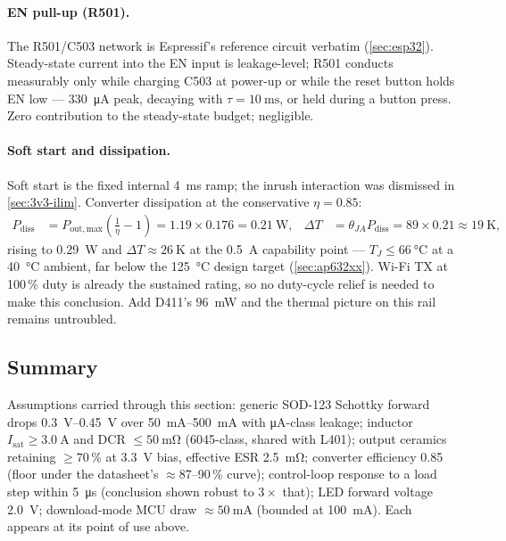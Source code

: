 \paragraph{EN pull-up (R501).} The R501/C503 network is Espressif's reference circuit
verbatim (\cref{sec:esp32}). Steady-state current into the EN input is leakage-level;
R501 conducts measurably only while charging C503 at power-up or while the reset
button holds EN low --- \SI{330}{\micro\ampere} peak, decaying with
$\tau = \SI{10}{\milli\second}$, or held during a button press. Zero contribution to
the steady-state budget; negligible.

\paragraph{Soft start and dissipation.} Soft start is the fixed internal
\SI{4}{\milli\second} ramp; the inrush interaction was dismissed in
\cref{sec:3v3-ilim}. Converter dissipation at the conservative $\eta=0.85$:
\begin{align*}
  P_{\mathrm{diss}} &= P_{\mathrm{out,max}}\left(\frac{1}{\eta}-1\right)
    = 1.19 \times 0.176 = \SI{0.21}{\watt}, &
  \Delta T &= \theta_{JA}P_{\mathrm{diss}} = 89 \times 0.21 \approx \SI{19}{\kelvin},
\end{align*}
rising to \SI{0.29}{\watt} and $\Delta T \approx \SI{26}{\kelvin}$ at the
\SI{0.5}{\ampere} capability point --- $T_J \leq \SI{66}{\celsius}$ at a
\SI{40}{\celsius} ambient, far below the \SI{125}{\celsius} design target
(\cref{sec:ap632xx}). Wi-Fi TX at 100\,\% duty is already the sustained rating, so no
duty-cycle relief is needed to make this conclusion. Add D411's \SI{96}{\milli\watt}
and the thermal picture on this rail remains untroubled.

\subsection{Summary}\label{sec:3v3-summary}

Assumptions carried through this section: generic SOD-123 Schottky forward drops
\SIrange{0.3}{0.45}{\volt} over \SIrange{50}{500}{\milli\ampere} with
\si{\micro\ampere}-class leakage; inductor $I_{\mathrm{sat}}\geq\SI{3.0}{\ampere}$ and
DCR $\leq\SI{50}{\milli\ohm}$ (6045-class, shared with L401); output ceramics retaining
$\geq70\,\%$ at 3.3~V bias, effective ESR \SI{2.5}{\milli\ohm}; converter efficiency
0.85 (floor under the datasheet's $\approx$87--90\,\% curve); control-loop response to
a load step within \SI{5}{\micro\second} (conclusion shown robust to $3\times$ that);
LED forward voltage \SI{2.0}{\volt}; download-mode MCU draw
$\approx\SI{50}{\milli\ampere}$ (bounded at \SI{100}{\milli\ampere}). Each appears at
its point of use above.

